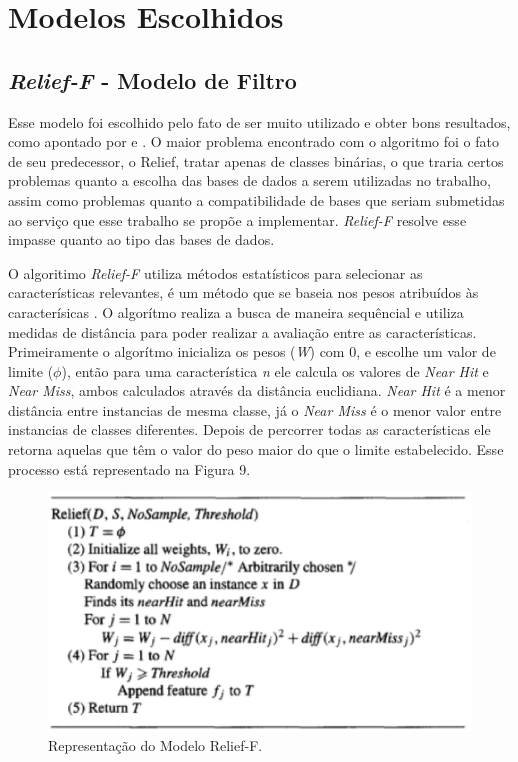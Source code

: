 \section{Modelos Escolhidos}

\subsection{\textit{Relief-F} - Modelo de Filtro}

Esse modelo foi escolhido pelo fato de ser muito utilizado e obter bons resultados, como apontado por  e . O maior problema encontrado com o algoritmo foi o fato de seu predecessor, o Relief, tratar apenas de classes binárias, o que traria certos problemas quanto a escolha das bases de dados a serem utilizadas no trabalho, assim como problemas quanto a compatibilidade de bases que seriam submetidas ao serviço que esse trabalho se propõe a implementar. \textit{Relief-F} resolve esse impasse quanto ao tipo das bases de dados.

O algoritimo \textit{Relief-F} utiliza métodos estatísticos para selecionar as características relevantes, é um método que se baseia nos pesos atribuídos às caracterísicas \cite{dash_1997}. O algorítmo realiza a busca de maneira sequêncial e utiliza medidas de distância para poder realizar a avaliação entre as características. Primeiramente o algorítmo inicializa os pesos (\textit{W}) com 0, e escolhe um valor de limite ($\phi$), então para uma característica \textit{n} ele calcula os valores de \textit{Near Hit} e \textit{Near Miss}, ambos calculados através da distância euclidiana. \textit{Near Hit} é a menor distância entre instancias de mesma classe, já o \textit{Near Miss} é o menor valor entre instancias de classes diferentes. Depois de percorrer todas as características ele retorna aquelas que têm o valor do peso maior do que o limite estabelecido. Esse processo está representado na Figura 9.

\begin{figure}[h]
	\centering
	\label{fig11}
		\includegraphics[keepaspectratio=true,scale=0.7]{figuras/fig11.eps}
	\caption{Representação do Modelo Relief-F. \cite{dash_1997}}
\end{figure}


